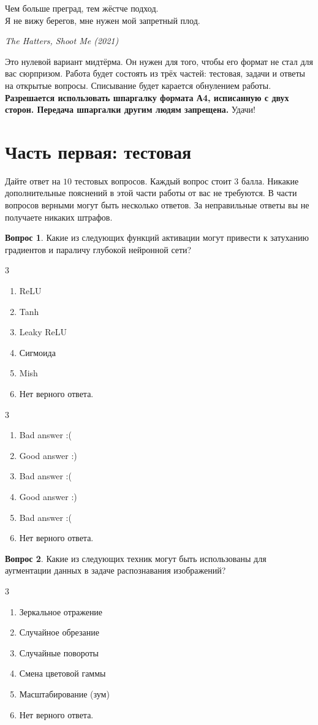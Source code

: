 \documentclass[12pt]{article}
\def \putyourname{\fbox{
    \begin{minipage}{42em}
      Фамилия, имя, номер группы:\vspace*{3ex}\par
      \noindent\dotfill\vspace{2mm}
    \end{minipage}
  }
}
\def \checktable{

    \vspace{5pt}
    Табличка для проверяющих работу:

\vspace{5pt}

    \begin{tabular}{|m{2cm}|m{1cm}|m{1cm}|m{1cm}|m{1cm}|m{1cm}|m{2cm}|}
\toprule
        Тест & 1 &  2 & 3 & 4 & 5 & Итого \\
\midrule
        &  &  & & & & \\
        &  &  & & & & \\
 \bottomrule
\end{tabular}
}
\def \testtable{

\vspace{5pt}
    Внесите сюда ответы на тест:

\vspace{5pt}

\begin{tabular}{|m{2cm}|m{0.6cm}|m{0.6cm}|m{0.6cm}|m{0.6cm}|m{0.6cm}|m{0.6cm}|m{0.6cm}|m{0.6cm}|m{0.6cm}|m{0.6cm}|}
\toprule
        Вопрос & 1 &  2 & 3 & 4 & 5 & 6 & 7 & 8 & 9 & 10 \\
\midrule
        Ответ &  &  & & & & & & & & \\
 \bottomrule
\end{tabular}
}
\newenvironment{answerlist}[1][3]{
\begin{multicols}{#1}

\begin{enumerate}[label=\fbox{\emph{\Alph*}},ref=\emph{\alph*}]
}
{
\item Нет верного ответа.
\end{enumerate}
\end{multicols}
}
\theoremstyle{definition}
\newtheorem{question}{Вопрос}
\begin{document}
\putyourname



\epigraph{Чем больше преград, тем жёстче подход. \\ Я не вижу берегов, мне нужен мой запретный плод.}{\textit{The Hatters, Shoot Me (2021)}}

Это нулевой вариант мидтёрма. Он нужен для того, чтобы его формат не стал для вас сюрпризом. Работа будет состоять из трёх частей:  тестовая, задачи и ответы на открытые вопросы. Списывание будет карается обнулением работы. \textbf{Разрешается использовать шпаргалку формата А4, исписанную с двух сторон. Передача шпаргалки другим людям запрещена.} Удачи!

\section*{Часть первая: тестовая} 

Дайте ответ на $10$ тестовых вопросов. Каждый вопрос стоит $3$ балла. Никакие дополнительные пояснений в этой части работы от вас не требуются. В части вопросов верными могут быть несколько ответов. За неправильные ответы вы не получаете никаких штрафов. 

\begin{question}
Какие из следующих функций активации могут привести к затуханию градиентов и параличу глубокой нейронной сети?
\begin{answerlist}
  \item ReLU
  \item Tanh
  \item Leaky ReLU
  \item Сигмоида
  \item Mish
\end{answerlist}
\end{question}

\begin{solution}
\begin{answerlist}
  \item Bad answer :(
  \item Good answer :)
  \item Bad answer :(
  \item Good answer :)
  \item Bad answer :(
\end{answerlist}
\end{solution}

\begin{question}
Какие из следующих техник могут быть использованы для аугментации данных в задаче распознавания изображений? 
    \begin{answerlist}
      \item Зеркальное отражение
      \item Случайное обрезание
      \item Случайные повороты
      \item Смена цветовой гаммы
      \item Масштабирование (зум)
    \end{answerlist}
\end{question}
\end{document}
